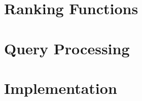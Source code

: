 
\section{Ranking Functions}\label{qr:ranking}


\section{Query Processing}\label{qr:queryprocess}


\section{Implementation}\label{qr:implementation}



